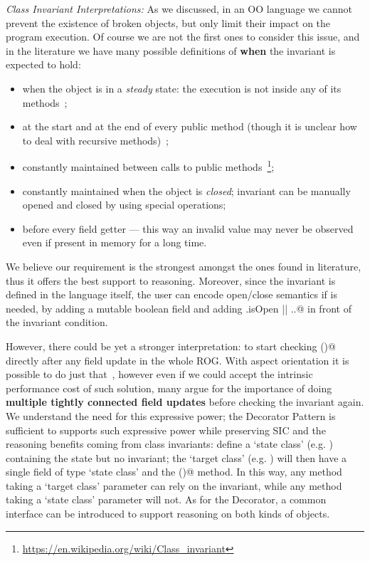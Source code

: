 \noindent\textit{Class Invariant Interpretations:}
As we discussed, in an OO language we cannot prevent the existence of broken objects,
but only limit their impact on the program execution.
Of course we are not the first ones to consider this issue, and in the literature we have many possible definitions
of \textbf{when} the invariant is expected to hold:
\begin{itemize}
\item  when the object is in a \textit{steady} state:
 the execution is not inside any of its methods~\cite{Gopinathan:2008:RMO:1483018.1483028};
\item
at the start and at the end of every public method
(though it is unclear how to deal with recursive methods)~\cite{Burdy2005};
\item
constantly maintained between calls to public methods~\footnote{\url{https://en.wikipedia.org/wiki/Class_invariant}};
\item
constantly maintained when the object is \textit{closed};
invariant can be manually opened and closed by using special operations; %
\item
before every field getter --- this way an invalid value may never be observed
even if present in memory for a long time.
\end{itemize}
\noindent We believe our requirement is the strongest amongst the ones found in literature,
thus it offers the best support to reasoning.
Moreover, since the invariant is defined in the language itself,
the user can encode open/close semantics if is needed,
by adding a mutable boolean \Q@isOpen@ field and adding \Q@this.isOpen || ..@
in front of the invariant condition.

\noindent However, there could be yet a stronger interpretation:
to start checking \Q@invariant()@ directly
after any field update in the whole ROG.
With aspect orientation it is possible to do just that~\cite{Gopinathan:2008:RMO:1483018.1483028},
however even if we could accept the intrinsic performance cost of such solution,
many argue for the importance of
doing \textbf{multiple tightly connected field updates} before checking the invariant again.
We understand the need for this
expressive power; the Decorator Pattern
is sufficient to supports such expressive power while 
preserving SIC and the reasoning benefits coming from 
class invariants:
define a `state class' (e.g. \Q@BoatState@) containing the state but no invariant;
the `target class' (e.g. \Q@Boat@) will then have a single 
\Q@capsule@ field of type `state class' and the \Q@invariant()@ method.
In this way, any method taking a `target class' parameter can
rely on the invariant, while any method taking a `state class' parameter will not.
As for the Decorator, a common interface can be introduced to support reasoning on both kinds of objects.



